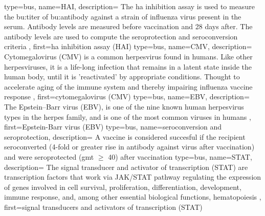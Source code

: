 {
    type=bus,
    name=HAI,
    description={
        The \acrlong{ha} inhibition assay is used to measure the \gls{bu:titer} of \gls{bu:antibody} against a strain of influenza virus present in the serum.
        Antibody levels are measured before vaccination and 28 days after.
        The antibody levels are used to compute the seroprotection and seroconversion criteria
    },
    first={\acrlong{ha} inhibition assay (HAI)}
}
{
    type=bus,
    name=CMV,
    description={
        Cytomegalovirus (CMV) is a common herpesvirus found in humans.
        Like other herpesviruses, it is a life-long infection that remains in a latent state inside the human body, until it is 'reactivated' by appropriate conditions.
        Thought to accelerate aging of the immune system and thereby impairing influenza vaccine response  \citep{van_den_Berg_2019}
    },
    first={cytomegalovirus (CMV)}
}
{
    type=bus,
    name=EBV,
    description={
        The Epstein–Barr virus (EBV), is one of the nine known human herpesvirus types in the herpes family, and is one of the most common viruses in humans
    },
    first={Epstein-Barr virus (EBV)}
}
{
    type=bus,
    name=seroconversion and seroprotection,
    description={
        A vaccine is considered succesful if the recipient seroconverted (4-fold or greater rise in antibody against virus after vaccination) and were seroprotected (\acrshort{gmt} \(\ge\) 40) after vaccination
    }
}
{
    type=bus,
    name=STAT,
    description={
        The signal transducer and activator of transcription (STAT) are transcription factors that work via JAK/STAT pathway regulating the expression of genes involved in cell survival, proliferation, differentiation, development, immune response, and, among other essential biological functions, hematopoiesis
    },
    first={signal transducers and activators of transcription (STAT)}
}



